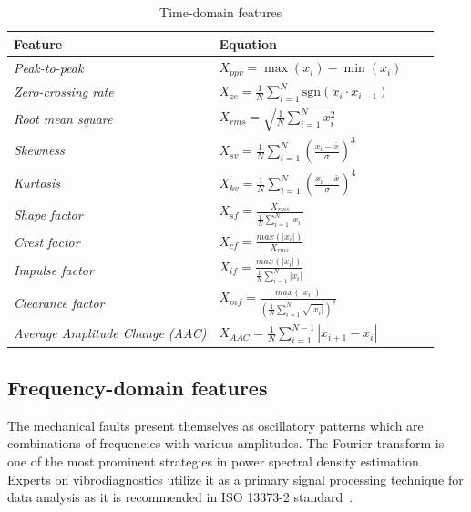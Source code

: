 \begin{table}[h]
\centering
\renewcommand{\arraystretch}{2}
\begin{tabular}{|l|l|l|l|}
\hline
\textbf{Feature}            & \textbf{Equation}                                                                    \\ \hline
\textit{Peak-to-peak}       & $ X_{ppv} = \max(x_i) - \min(x_i) $               
\\ \hline
\textit{Zero-crossing rate} & $X_{zc} = \frac{1}{N}\sum_{i = 1}^{N}{\mathrm{sgn}(x_i \cdot x_{i-1})} $
\\ \hline
\textit{Root mean square}   & $ X_{rms} = \sqrt{\frac{1}{N}\sum_{i = 1}^{N}{x_i^2}} $ 
\\ \hline
\textit{Skewness}           & $ X_{sv} = \frac{1}{N}\sum_{i = 1}^{N}{\left(\frac{x_i - \bar{x}}{\sigma}\right)^3}$      
\\ \hline
\textit{Kurtosis}           & $ X_{kv} = \frac{1}{N}\sum_{i = 1}^{N}{\left(\frac{x_i - \bar{x}}{\sigma}\right)^4}$                                           
\\ \hline
\textit{Shape factor}   & $ X_{sf} = \frac{X_{rms}}{\frac{1}{N} \sum_{i=1}^{N}{|x_i|}}$  
\\ \hline
\textit{Crest factor}   & $ X_{cf} = \frac{max(|x_i|)}{X_{rms}} $                           \\ \hline
\textit{Impulse factor} & $ X_{if} = \frac{max(|x_i|)}{\frac{1}{N} \sum_{i=1}^{N}{|x_i|}} $                                                 
\\ \hline       
\textit{Clearance factor}  & $ X_{mf} = \frac{max(|x_i|)}{\left( \frac{1}{N} \sum_{i=1}^{N}{\sqrt{|x_i|}} \right)^2} $ 
\\ \hline
\textit{Average Amplitude Change (AAC)}        & $ X_{AAC} = \frac{1}{N}\sum_{i = 1}^{N - 1}{|x_{i + 1} - x_i|} $                             \\ \hline                                                                                     
\end{tabular}
\caption{Time-domain features}
\label{tab:td-features}
\end{table}


\subsection{Frequency-domain features}
The mechanical faults present themselves as oscillatory patterns which are combinations of frequencies with various amplitudes. The Fourier transform is one of the most prominent strategies in power spectral density estimation. Experts on vibrodiagnostics utilize it as a primary signal processing technique for data analysis as it is recommended in ISO 13373-2 standard~\cite{noauthor_iso_2016_2}. 


